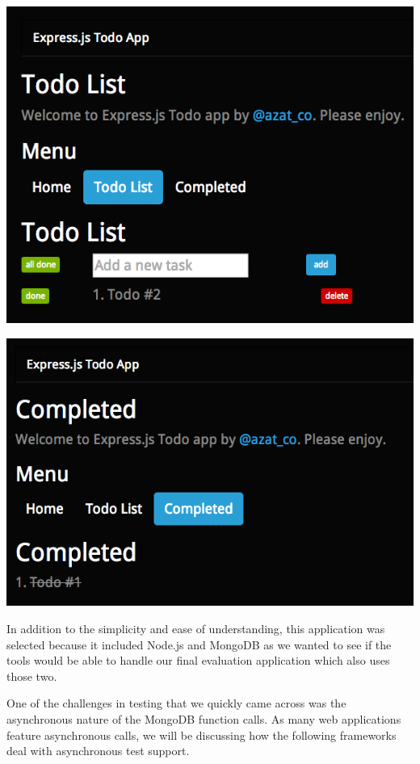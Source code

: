 \documentclass[12pt]{ucthesis}
\newenvironment{Figure}
  {\par\medskip\noindent\minipage{\linewidth}}
  {\endminipage\par\medskip}
\begin{document}
\begin{Figure}
  \centering
  \includegraphics[width=0.75\linewidth]{todo_some_tasks.png}
  
  
\end{Figure}

\begin{Figure}
  \centering
  \includegraphics[width=0.75\linewidth]{todo_completed.png}
  

\end{Figure}

In addition to the simplicity and ease of understanding, this application was selected because it included Node.js and MongoDB as we wanted to see if the tools would be able to handle our final evaluation application which also uses those two.

One of the challenges in testing that we quickly came across was the asynchronous nature of the MongoDB function calls. As many web applications feature asynchronous calls, we will be discussing how the following frameworks deal with asynchronous test support.
\end{document}
